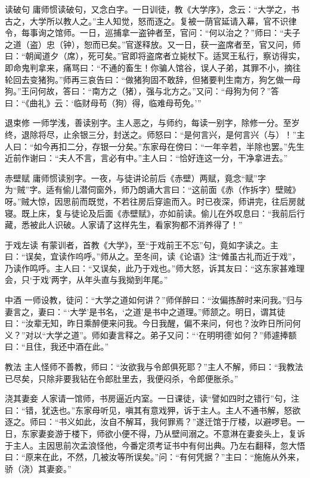 \documentclass[12pt,UTF8]{ctexbook}
\begin{document}
读破句
庸师惯读破句，又念白字。一日训徒，教《大学序》，念云：“大学之，书古之，大学所以教人之。”主人知觉，怒而逐之。复被一荫官延请入幕，官不识律令，每事询之馆师。一日，巡捕拿一盗钟者至，官问：“何以治之？”师曰：“夫子之道（盗）忠（钟），恕而已矣。”官遂释放。又一日，获一盗席者至，官又问，师曰：“朝闻道夕（席），死可矣。”官即将盗席者立毙杖下。适冥王私行，察访得实，即命鬼判拿来，痛骂曰：“不通的畜生！你骗人馆谷，误人子弟，其罪不小，摘往轮回去变猪狗。”师再三哀告曰：“做猪狗固不敢辞，但猪要判生南方，狗乞做一母狗。”王问何故，答曰：“南方之（猪），强与北方之。”又问：“母狗为何？”答曰：“《曲礼》云：‘临财母苟（狗）得，临难母苟免。’”

退束修
一师学浅，善读别字。主人恶之，与师约，每读一别字，除修一分。至岁终，退除将尽，止余银三分，封送之。师怒曰：“是何言兴，是何言兴（与）！”主人曰：“如今再扣二分，存银一分矣。”东家母在傍曰：“一年辛若，半除也罢。”先生近前作谢曰：“夫人不言，言必有中。”主人曰：“恰好连这一分，干净拿进去。”

赤壁赋
庸师惯读别字。一夜，与徒讲论前后《赤壁）两赋，竟念“赋”字为“贼”字。适有偷儿潜伺窗外，师乃朗诵大言曰：“这前面《赤（作拆字）壁贼》呀。”贼大惊，因思前而既觉，不若往房后穿逾而入。时已夜深，师讲完，往后房就寝。既上床，复与徒论及后面《赤壁赋》，亦如前读。偷儿在外叹息曰：“我前后行藏，悉被此人识破。人家请了这样先生，看家狗都不消养得了！”

于戏左读
有蒙训者，首教《大学》，至“于戏前王不忘”句，竟如字读之。主曰：“误矣，宜读作呜呼。”师从之。至冬间，读《论语》注“傩虽古礼而近于戏”，乃读作鸣呼。主人曰：“又误矣，此乃于戏也。”师大怒，诉其友曰：“这东家甚难理会，只‘于戏’两字，从年头直与我拗到年尾。”

中酒
一师设教，徒问：“大学之道如何讲？”师佯醉曰：“汝偏拣醉时来问我。”归与妻言之，妻曰：“‘大学’是书名，‘之道’是书中之道理。”师颔之。明日，谓其徒曰：“汝辈无知，昨日乘醉便来问我。今日我醒，偏不来问，何也？汝昨日所问何义？”对以“大学之道”。师如妻言释之。弟子又问：“‘在明明德’如何？”师遽捧额曰：“且住，我还中酒在此。”

教法
主人怪师不善教，师曰：“汝欲我与令郎俱死耶？”主人不解，师曰：“我教法已尽矣，只除非要我钻在令郎肚里去，我便闷杀，令郎便胀杀。”

浇其妻妾
人家请一馆师，书房逼近内室。一日课徒，读“譬如四时之错行”句，注曰：“错，犹迭也。”东家母听见，嗔其有意戏狎，诉于主人。主人不通书解，怒欲逐之。师曰：“书义如此，汝自不解耳，我何罪焉？”遂迁馆于厅楼，以避啰皂。一日，东家妻妾游于楼下，师欲小便不得，乃从壁间溺之。不意淋在妻妾头上，复诉于主人。主因思前次孟浪怪他，今番定须考证书中有何出典。乃左右翻释，忽大悟曰：“原来在此，不然，几被汝等所误矣。”问：“有何凭据？”主曰：“施施从外来，骄（浇）其妻妾。”
\end{document}
